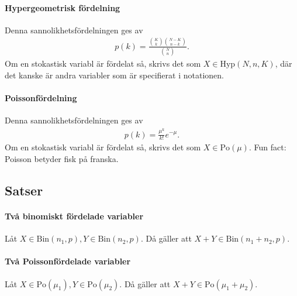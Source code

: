 \paragraph{Hypergeometrisk fördelning}
Denna sannolikhetsfördelningen ges av
\begin{align*}
	p(k) = \frac{\binom{K}{k}\binom{N - K}{n - k}}{\binom{N}{n}}.
\end{align*}
Om en stokastisk variabl är fördelat så, skrivs det som $X\in\text{Hyp}(N, n, K)$, där det kanske är andra variabler som är specifierat i notationen.

\paragraph{Poissonfördelning}
Denna sannolikhetsfördelningen ges av
\begin{align*}
	p(k) = \frac{\mu^k}{k!}e^{-\mu}.
\end{align*}
Om en stokastisk variabl är fördelat så, skrivs det som $X\in\text{Po}(\mu)$. Fun fact: Poisson betyder fisk på franska.

\subsection{Satser}

\paragraph{Två binomiskt fördelade variabler}
Låt $X\in\text{Bin}(n_1, p), Y\in\text{Bin}(n_2, p)$. Då gäller att $X + Y\in\text{Bin}(n_1 + n_2, p)$.

\proof

\paragraph{Två Poissonfördelade variabler}
Låt $X\in\text{Po}(\mu_1), Y\in\text{Po}(\mu_2)$. Då gäller att $X + Y\in\text{Po}(\mu_1 + \mu_2)$.

\proof